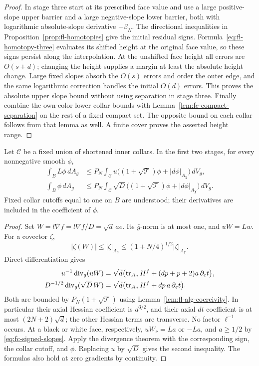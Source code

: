 \begin{proof}
In stage three start at its prescribed face value and use a large
positive-slope upper barrier and a large negative-slope lower
barrier, both with logarithmic absolute-slope derivative
$-\beta_N$.  The directional inequalities in
Proposition~\ref{prop:fl-homotopies} give the initial residual
signs.  Formula~\eqref{eq:fl-homotopy-three} evaluates its shifted
height at the original face value, so these signs persist along
the interpolation.  At the unshifted face height all errors are
$O(s+d)$; changing the height supplies a margin at least the
absolute height change.  Large fixed slopes absorb the $O(s)$
errors and order the outer edge, and the same logarithmic
correction handles the initial $O(d)$ errors.  This proves the
absolute upper slope bound without using separation in stage
three.  Finally combine the own-color lower collar bounds with
Lemma~\ref{lem:fc-compact-separation} on the rest of a fixed
compact set.  The opposite bound on each collar follows from that
lemma as well.  A finite cover proves the asserted height range.
\end{proof}

\begin{lemma}
\label{lem:fc-trace-estimate}
Let $\mathcal C$ be a fixed union of shortened inner collars.
In the first two stages, for every nonnegative smooth $\phi$,
\begin{align}
 \int_B L\phi\,dA_g
 &\le P_N\int_{\mathcal C}u
       \bigl((1+\sqrt{\mathcal T})\phi+|d\phi|_{A_\chi}\bigr)
            \,dV_g,\label{eq:fc-weighted-trace}\\
 \int_B \phi\,dA_g
 &\le P_N\int_{\mathcal C}\sqrt D
       \bigl((1+\sqrt{\mathcal T})\phi+|d\phi|_{A_\chi}\bigr)
            \,dV_g.\label{eq:fc-unweighted-trace}
\end{align}
Fixed collar cutoffs equal to one on $B$ are understood; their
derivatives are included in the coefficient of $\phi$.
\end{lemma}

\begin{proof}
Set $W=l\bar\nabla f=l\nabla f/D=\sqrt d\,a e$.
Its $\bar g$-norm is at most one, and $uW=Lw$.  For a covector
$\zeta$,
\[
 |\zeta(W)|\le|\zeta|_{A_d}
       \le(1+N/4)^{1/2}|\zeta|_{A_\chi}.
\]
Direct differentiation gives
\begin{align*}
 u^{-1}\operatorname{div}_g(uW)
 &=\sqrt d\bigl(\operatorname{tr}_{A_d}H^f+(dp+p+2)a\,\partial_e t\bigr),\\
 D^{-1/2}\operatorname{div}_g(\sqrt D\,W)
 &=\sqrt d\bigl(\operatorname{tr}_{A_d}H^f+dp\,a\,\partial_e t\bigr).
\end{align*}
Both are bounded by $P_N(1+\sqrt{\mathcal T})$ using
Lemma~\ref{lem:fl-alg-coercivity}.  In particular their axial
Hessian coefficient is $d^{3/2}$, and their axial $dt$ coefficient
is at most $(2N+2)\sqrt d$; the other Hessian terms are transverse.
No factor $\ell^{-1}$ occurs.  At a black or white face, respectively,
$uW_\nu=La$ or $-La$, and $a\ge1/2$ by
\eqref{eq:fc-signed-slopes}.  Apply the divergence theorem with
the corresponding sign, the collar cutoff, and $\phi$.  Replacing
$u$ by $\sqrt D$ gives the second inequality.  The formulas also
hold at zero gradients by continuity.
\end{proof}

